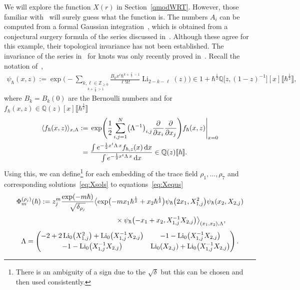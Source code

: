 \documentclass[pdftex]{sigma}
\numberwithin{equation}{section}
\def\BZ{\mathbb{Z}}
\def\BQ{\mathbb{Q}}
\def\Li{\mathrm{Li}}
\def\BZ{\mathbb Z}
\def\BQ{\mathbb Q}
\def\Li{\operatorname{Li}}
\begin{document}
We will explore the function $X(r)$ in Section~\ref{qmodWRT}. However, those familiar with~\cite{Zagier:Qmod} will surely guess what the function is. The numbers $A_{i}$ can be computed from a formal Gaussian integration~\cite{Gang}, which is obtained from a conjectural surgery formula of the series discussed in~\cite{DimGar:QC}. Although these agree for this example, their topological invariance has not been established. The invariance of the series in~\cite{DimGar:QC} for knots was only recently proved in~\cite{GSW}. Recall the notation of~\cite{GSW},
\begin{gather*}
 \psi_{\hbar}(x,z)
 :=
 \exp\Biggl( -  \sum_{\underset{k+\frac{\ell}{2}>1}{k,\ell\in\BZ_{\geq0}}}
 \frac{B_{k} x^{\ell} \hbar^{k+\frac{\ell}{2}-1}}{\ell!k!}\Li_{2-k-\ell}(z)\Biggr)
 \in1+\hbar^{\frac{1}{2}}\BQ\bigl[z,(1-z)^{-1}\bigr][x]\bigl\llbracket\hbar^{\frac{1}{2}}
 \bigr\rrbracket ,
\end{gather*}
where $B_{k}=B_{k}(0)$ are the Bernoulli numbers and for $f_\hbar(x,z)\in\BQ(z)[x]\bigl\llbracket \hbar^{\frac12} \bigr\rrbracket$
\begin{align*}
\langle
f_\hbar(x,z)
\rangle_{x,\Lambda}
:={}&  \exp\Biggl(
{\frac 1 2 \sum_{i,j=1}^N \bigl(\Lambda^{-1}\bigr)_{i,j}
\frac{\partial}{\partial x_i}
\frac{\partial}{\partial x_j}}\Biggr)
f_\hbar(x,z) \Biggl|_{x=0}\\
  ={}&
\frac{\int e^{-\frac12x^t \Lambda \,x}f_{\hbar,z}(x) \, {\rm d}x}{
 \int e^{-\frac12x^t \Lambda \,x} \, {\rm d}x}
\in \BQ(z)\llbracket \hbar \rrbracket .
\end{align*}
Using this, we can define\footnote{There is an ambiguity of a sign due to the $\sqrt{\delta}$ but this can be chosen and then used consistently.} for each embedding of the trace field $\rho_1,\dots,\rho_7$ and corresponding solutions~\eqref{eq:Xsols} to equations~\eqref{eq:Xequs}
\begin{gather*}
  \Phi^{(\rho_{j})}_{m}(\hbar)
:=
 z_{j}^m\frac{\exp(-m\hbar)}{\sqrt{\delta_{\rho_j}}}
 \bigl\langle
 \exp\bigl(-mx_1\hbar^{\frac{1}{2}}+x_2\hbar^{\frac{1}{2}}\bigr)
 \psi_{\hbar}\bigl(2x_1,X_{1,j}^2\bigr)
 \psi_{\hbar}(x_2,X_{2,j})\\[1mm]
 \hphantom{\Phi^{(\rho_{j})}_{m}(\hbar):= z_{j}^m\frac{\exp(-m\hbar)}{\sqrt{\delta_{\rho_j}}} \bigl\langle}
 {}\times
 \psi_{\hbar}\bigl(-x_1+x_2,X_{1,j}^{-1}X_{2,j}\bigr)
 \bigr\rangle_{(x_1,x_2),\Lambda} ,\\[1mm]
 \Lambda
 =
 \begin{pmatrix}
 -2+2\Li_{0}\bigl(X_{1,j}^2\bigr)+\Li_{0}\bigl(X_{1,j}^{-1}X_{2,j}\bigr) & -1-\Li_{0}\bigl(X_{1,j}^{-1}X_{2,j}\bigr)\\[1mm]
 -1-\Li_{0}\bigl(X_{1,j}^{-1}X_{2,j}\bigr) & \Li_{0}(X_{2,j})+\Li_{0}\bigl(X_{1,j}^{-1}X_{2,j}\bigr)
 \end{pmatrix} .
\end{gather*}
\end{document}
